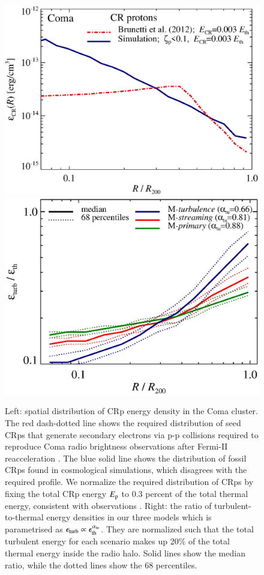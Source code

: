 \documentclass[useAMS,usenatbib]{mn2e}
\begin{document}
\begin{figure}
  \includegraphics[width=1.0\columnwidth]{figures/fCR.radius.coma.g72a.Rad14.2400p.z0.NL.xKR.eb23.eI066.DII.140.v5.halo.test5.eps}
  \includegraphics[width=1.0\columnwidth]{figures/turb_profile_ratio.eps}
  \caption{Left: spatial distribution of CRp energy density in the
    Coma cluster. The red dash-dotted line shows the required
    distribution of seed CRps that generate secondary electrons via
    p-p collisions required to reproduce Coma radio brightness
    observations after Fermi-II reacceleration \citep{brunetti12}. The
    blue solid line shows the distribution of fossil CRps found in
    cosmological simulations, which disagrees with the required
    profile. We normalize the required distribution of CRps by fixing
    the total CRp energy $E_{\mathrm{p}}$ to 0.3 percent of the total
    thermal energy, consistent with observations
    \citep{2014ApJ...787...18A,2012ApJ...757..123A}. Right: the ratio
    of turbulent-to-thermal energy densities in our three models which
    is parametrised as $\epsilon_{\mathrm{turb}} \propto
    \epsilon_{\mathrm{th}}^{\alpha_{{\mathrm{tu}}}}$. They are normalized such
      that the total turbulent energy for each scenario makes up 20\%
      of the total thermal energy inside the radio halo. Solid lines
      show the median ratio, while the dotted lines show the 68
      percentiles.}
    \label{fig:Edens}
\end{figure}
\end{document}
